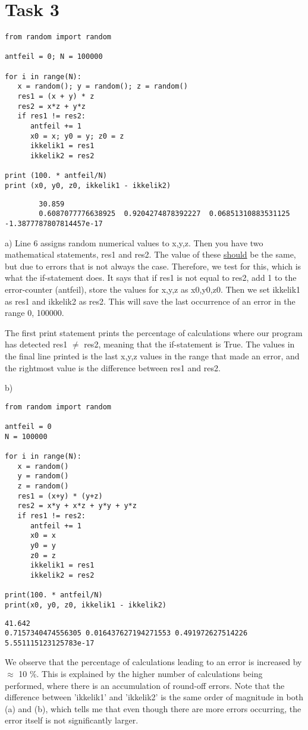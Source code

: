 \documentclass[11pt,
				a4paper,
				article,
				oneside,
				oldfontcommands]{memoir}
\begin{document}
\pagebreak

\section{Task 3}
\begin{lstlisting}
from random import random

antfeil = 0; N = 100000

for i in range(N):
   x = random(); y = random(); z = random()
   res1 = (x + y) * z
   res2 = x*z + y*z
   if res1 != res2:
      antfeil += 1
      x0 = x; y0 = y; z0 = z
      ikkelik1 = res1
      ikkelik2 = res2

print (100. * antfeil/N)
print (x0, y0, z0, ikkelik1 - ikkelik2)
\end{lstlisting}
{\footnotesize
	\begin{verbatim}
		30.859
		0.6087077776638925  0.9204274878392227  0.06851310883531125  -1.3877787807814457e-17
	\end{verbatim}
}
a) 
Line 6 assigns random numerical values to x,y,z. Then you have two mathematical statements, res1 and res2. The value of these \underline{should} be the same, but due to errors that is not always the case. Therefore, we test for this, which is what the if-statement does. It says that if res1 is not equal to res2, add 1 to the error-counter (antfeil), store the values for x,y,z as x0,y0,z0. Then we set ikkelik1 as res1 and ikkelik2 as res2. This will save the last occurrence of an error in the range 0, 100000.

The first print statement prints the percentage of calculations where our program has detected res1 $\neq$ res2, meaning that the if-statement is True. The values in the final line printed is the last x,y,z values in the range that made an error, and the rightmost value is the difference between res1 and res2.

\pagebreak

b) 
\begin{lstlisting}
from random import random

antfeil = 0
N = 100000

for i in range(N):
   x = random()
   y = random()
   z = random()
   res1 = (x+y) * (y+z) 
   res2 = x*y + x*z + y*y + y*z
   if res1 != res2:
      antfeil += 1
      x0 = x
      y0 = y
      z0 = z
      ikkelik1 = res1
      ikkelik2 = res2

print(100. * antfeil/N)
print(x0, y0, z0, ikkelik1 - ikkelik2)
\end{lstlisting}
{\footnotesize
	\begin{verbatim}
41.642
0.7157340474556305 0.016437627194271553 0.491972627514226 5.551115123125783e-17
	\end{verbatim}
}
We observe that the percentage of calculations leading to an error is increased by $\approx$ 10 \%. This is explained by the higher number of calculations being performed, where there is an accumulation of round-off errors. Note that the difference between 'ikkelik1' and 'ikkelik2' is the same order of magnitude in both (a) and (b), which tells me that even though there are more errors occurring, the error itself is not significantly larger.
\end{document}
